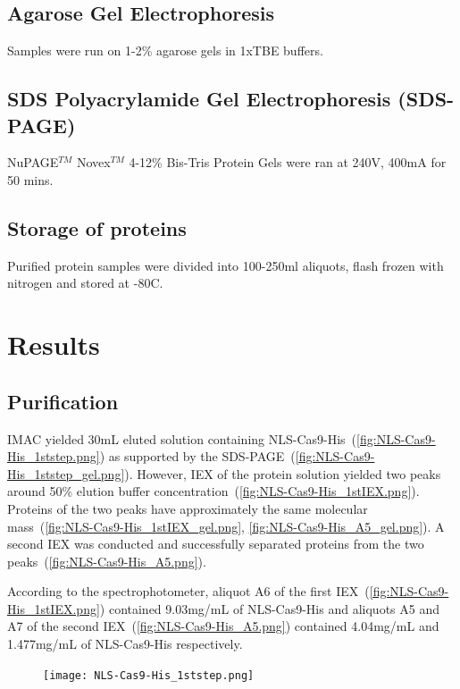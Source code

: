 \documentclass[11pt]{article}
\begin{document}
\subsection{Agarose Gel Electrophoresis}
Samples were run on 1-2\% agarose gels in 1xTBE buffers.

\subsection{SDS Polyacrylamide Gel Electrophoresis (SDS-PAGE)}
NuPAGE$^{TM}$ Novex$^{TM}$ 4-12\% Bis-Tris Protein Gels were ran at 240V, 400mA for 50 mins.

\subsection{Storage of proteins}
Purified protein samples were divided into 100-250ml aliquots, flash frozen with nitrogen and stored at -80\degree C.

\section{Results}
\subsection{Purification}
IMAC yielded 30mL eluted solution containing NLS-Cas9-His~(\autoref{fig:NLS-Cas9-His_1ststep.png}) as supported by the SDS-PAGE~(\autoref{fig:NLS-Cas9-His_1ststep_gel.png}). However, IEX of the protein solution yielded two peaks around 50\% elution buffer concentration~(\autoref{fig:NLS-Cas9-His_1stIEX.png}). Proteins of the two peaks have approximately the same molecular mass~(\autoref{fig:NLS-Cas9-His_1stIEX_gel.png}, \autoref{fig:NLS-Cas9-His_A5_gel.png}). A second IEX was conducted and successfully separated proteins from the two peaks~(\autoref{fig:NLS-Cas9-His_A5.png}).

According to the spectrophotometer, aliquot A6 of the first IEX~(\autoref{fig:NLS-Cas9-His_1stIEX.png}) contained 9.03mg/mL of NLS-Cas9-His and aliquots A5 and A7 of the second IEX~(\autoref{fig:NLS-Cas9-His_A5.png}) contained 4.04mg/mL and 1.477mg/mL of NLS-Cas9-His respectively.
\\

\begin{figure}[H]
  \centering
    \texttt{[image: NLS-Cas9-His\_1ststep.png]}
    \label{fig:NLS-Cas9-His_1ststep.png}
\end{figure}
\end{document}
